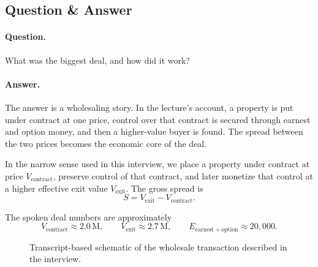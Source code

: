 \subsection{Question \& Answer}

\paragraph{Question.}
What was the biggest deal, and how did it work?

\paragraph{Answer.}
The answer is a wholesaling story. In the lecture's account, a property is put under contract at one price, control over that contract is secured through earnest and option money, and then a higher-value buyer is found. The spread between the two prices becomes the economic core of the deal.

\begin{definition}
In the narrow sense used in this interview, we place a property under contract at price \(V_{\mathrm{contract}}\), preserve control of that contract, and later monetize that control at a higher effective exit value \(V_{\mathrm{exit}}\). The gross spread is
\begin{equation}
S = V_{\mathrm{exit}} - V_{\mathrm{contract}} .
\end{equation}
\end{definition}

The spoken deal numbers are approximately
\begin{equation}
V_{\mathrm{contract}} \approx 2.0\,\mathrm{M},
\qquad
V_{\mathrm{exit}} \approx 2.7\,\mathrm{M},
\qquad
E_{\mathrm{earnest+option}} \approx 20{,}000 .
\end{equation}

\begin{figure}[h]
\centering
{}
\caption{Transcript-based schematic of the wholesale transaction described in the interview.}
\end{figure}

